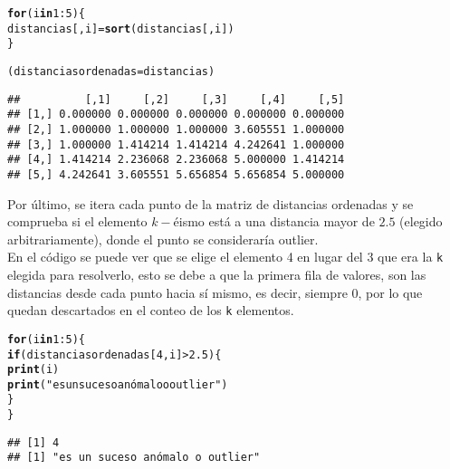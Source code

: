 \documentclass[12pt]{report}\usepackage[]{graphicx}\usepackage[dvipsnames]{xcolor}
\makeatletter
\newcommand{\hlnum}[1]{\textcolor[rgb]{0.686,0.059,0.569}{#1}}%
\newcommand{\hlstr}[1]{\textcolor[rgb]{0.192,0.494,0.8}{#1}}%
\newcommand{\hlopt}[1]{\textcolor[rgb]{0,0,0}{#1}}%
\newcommand{\hlstd}[1]{\textcolor[rgb]{0.345,0.345,0.345}{#1}}%
\newcommand{\hlkwa}[1]{\textcolor[rgb]{0.161,0.373,0.58}{\textbf{#1}}}%
\newcommand{\hlkwb}[1]{\textcolor[rgb]{0.69,0.353,0.396}{#1}}%
\newcommand{\hlkwd}[1]{\textcolor[rgb]{0.737,0.353,0.396}{\textbf{#1}}}%
\newenvironment{kframe}{%
 \def\at@end@of@kframe{}%
 \ifinner\ifhmode%
  \def\at@end@of@kframe{\end{minipage}}%
  \begin{minipage}{\columnwidth}%
 \fi\fi%
 \def\FrameCommand##1{\hskip\@totalleftmargin \hskip-\fboxsep
 \colorbox{shadecolor}{##1}\hskip-\fboxsep
     \hskip-\linewidth \hskip-\@totalleftmargin \hskip\columnwidth}%
 \MakeFramed {\advance\hsize-\width
   \@totalleftmargin\z@ \linewidth\hsize
   \@setminipage}}%
 {\par\unskip\endMakeFramed%
 \at@end@of@kframe}
\newenvironment{knitrout}{}{} %
\makeatother
\begin{document}
\begin{knitrout}
\color{fgcolor}\begin{kframe}
\begin{alltt}
\hlkwa{for} \hlstd{(i} \hlkwa{in} \hlnum{1}\hlopt{:}\hlnum{5}\hlstd{) \{}
        \hlstd{distancias[,i]} \hlkwb{=} \hlkwd{sort}\hlstd{(distancias[,i])}
\hlstd{\}}

\hlstd{(distanciasordenadas}\hlkwb{=}\hlstd{distancias)}
\end{alltt}
\begin{verbatim}
##          [,1]     [,2]     [,3]     [,4]     [,5]
## [1,] 0.000000 0.000000 0.000000 0.000000 0.000000
## [2,] 1.000000 1.000000 1.000000 3.605551 1.000000
## [3,] 1.000000 1.414214 1.414214 4.242641 1.000000
## [4,] 1.414214 2.236068 2.236068 5.000000 1.414214
## [5,] 4.242641 3.605551 5.656854 5.656854 5.000000
\end{verbatim}
\end{kframe}
\end{knitrout}
					
					Por último, se itera cada punto de la matriz de distancias ordenadas y se comprueba si el elemento $k-$éismo está a una distancia mayor de $2.5$ (elegido arbitrariamente), donde el punto se consideraría outlier.\\
					
					En el código se puede ver que se elige el elemento 4 en lugar del 3 que era la \texttt{k} elegida para resolverlo, esto se debe a que la primera fila de valores, son las distancias desde cada punto hacia sí mismo, es decir, siempre 0, por lo que quedan descartados en el conteo de los \texttt{k} elementos.
					
\begin{knitrout}
\color{fgcolor}\begin{kframe}
\begin{alltt}
\hlkwa{for} \hlstd{(i} \hlkwa{in} \hlnum{1}\hlopt{:}\hlnum{5}\hlstd{) \{}
        \hlkwa{if} \hlstd{(distanciasordenadas[}\hlnum{4}\hlstd{,i]} \hlopt{>} \hlnum{2.5}\hlstd{) \{}
                \hlkwd{print}\hlstd{(i)}
                \hlkwd{print}\hlstd{(}\hlstr{"es un suceso anómalo o outlier"}\hlstd{)}
        \hlstd{\}}
\hlstd{\}}
\end{alltt}
\begin{verbatim}
## [1] 4
## [1] "es un suceso anómalo o outlier"
\end{verbatim}
\end{kframe}
\end{knitrout}
					
\end{document}
